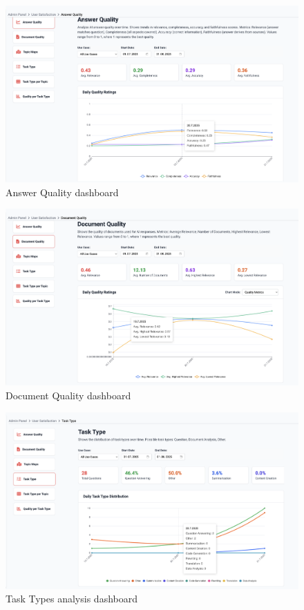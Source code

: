 \documentclass[
	english,
	ruledheaders=section,%
	class=report,%
	thesis={type=bachelor},%
	accentcolor=1b,%
	custommargins=true,%
	marginpar=false,%
	parskip=half-,%
	fontsize=11pt,%
	DIV=14,
]{tudapub}
\begin{document}
\begin{figure}[h!]
    \centering
    \includegraphics[width=0.75\linewidth]{images/AnswerQuality.png}
    \captionsetup{list=no}
    \caption{Answer Quality dashboard}
    \label{fig:answer_quality}
\end{figure}

\begin{figure}[h!]
    \centering
    \includegraphics[width=0.75\linewidth]{images/DocumentQuality.png}
    \captionsetup{list=no}
    \caption{Document Quality dashboard}
    \label{fig:document_quality}
\end{figure}

\begin{figure}[h!]
    \centering
    \includegraphics[width=0.75\linewidth]{images/TaskTypes.png}
    \captionsetup{list=no}
    \caption{Task Types analysis dashboard}
    \label{fig:task_types}
\end{figure}
\end{document}
